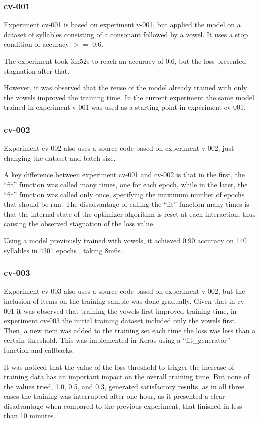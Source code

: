 \subsubsection{cv-001}
Experiment cv-001 is based on experiment v-001, but applied the model on a dataset of syllables consisting of a consonant followed by a vowel. It uses a stop condition of accuracy $>=$ 0.6.

The experiment took 3m52s to reach an accuracy of 0.6, but the loss presented stagnation after that.

However, it was observed that the reuse of the model already trained with only the vowels improved the training time. In the current experiment the same model trained in experiment v-001 was used as a starting point in experiment cv-001.

\subsubsection{cv-002}
Experiment cv-002 also uses a source code based on experiment v-002, just changing the dataset and batch size.

A key difference between experiment cv-001 and cv-002 is that in the first, the ``fit'' function was called many times, one for each epoch, while in the later, the ``fit'' function was called only once, specifying the maximum number of epochs that should be run. The disadvantage of calling the ``fit'' function many times is that the internal state of the optimizer algorithm is reset at each interaction, thus causing the observed stagnation of the loss value.

Using a model previously trained with vowels, it achieved 0.90 accuracy on 140 syllables in 4301 epochs , taking 8m6s.

\subsubsection{cv-003}

Experiment cv-003 also uses a source code based on  experiment v-002, but the inclusion of items on the training sample was done gradually. Given that in cv-001 it was observed that training the vowels first improved training time, in experiment cv-003 the initial training dataset included only the vowels first. Then, a new item was added to the training set each time the loss was less than a certain threshold. This was implemented in Keras using a ``fit\_generator'' function and callbacks.

It was noticed that the value of the loss threshold to trigger the increase of training data has an important impact on the overall training time. But none of the values tried, 1.0, 0.5, and 0.3, generated satisfactory results, as in all three cases the training was interrupted after one hour, as it presented a clear disadvantage when compared to the previous experiment, that finished in less than 10 minutes.

